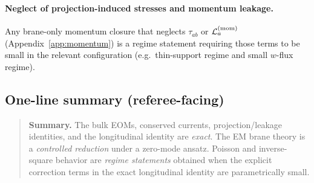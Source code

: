 \documentclass[11pt]{article}
\begin{document}
\paragraph{Neglect of projection-induced stresses and momentum leakage.}
Any brane-only momentum closure that neglects $\tau_{ab}$ or $\mathcal{L}^{({\rm mom})}_a$ (Appendix~\ref{app:momentum}) is a regime statement requiring those terms to be small in the relevant configuration (e.g.\ thin-support regime and small $w$-flux regime).

\subsection{One-line summary (referee-facing)}
\label{app:claims-summary}

\begin{quote}\small
\textbf{Summary.} The bulk EOMs, conserved currents, projection/leakage identities, and the longitudinal identity are \emph{exact}. The EM brane theory is a \emph{controlled reduction} under a zero-mode ansatz. Poisson and inverse-square behavior are \emph{regime statements} obtained when the explicit correction terms in the exact longitudinal identity are parametrically small.
\end{quote}
\end{document}
